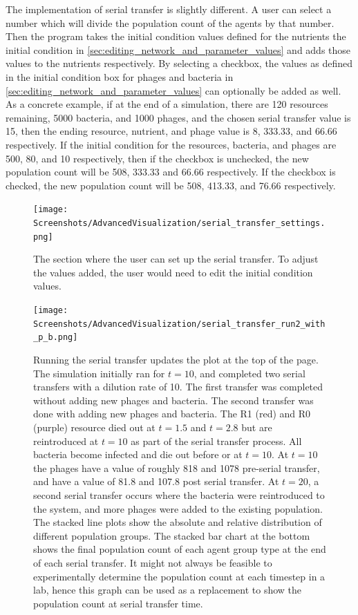 The implementation of serial transfer is slightly different. 
A user can select a number which will divide the population count of the agents by that number. 
Then the program takes the initial condition values defined for the nutrients the initial condition in \ref{sec:editing_network_and_parameter_values} and adds those values to the nutrients respectively. 
By selecting a checkbox, the values as defined in the initial condition box for phages and bacteria in \ref{sec:editing_network_and_parameter_values} can optionally be added as well. 
As a concrete example, if at the end of a simulation, there are 120 resources remaining, 5000 bacteria, and 1000 phages, and the chosen serial transfer value is 15, then the ending resource, nutrient, and phage value is 8, 333.33, and 66.66 respectively. 
If the initial condition for the resources, bacteria, and phages are 500, 80, and 10 respectively, then if the checkbox is unchecked, the new population count will be 508, 333.33 and 66.66 respectively. 
If the checkbox is checked, the new population count will be 508, 413.33, and 76.66 respectively. 

\begin{figure}
    \centering
    \texttt{[image: Screenshots/AdvancedVisualization/serial\_transfer\_settings.png]}
    \caption{
        The section where the user can set up the serial transfer. To adjust the values added, the user would need to edit the initial condition values. 
    }
    \label{fig:ss:av:serial_transfer_settings}
\end{figure}
\begin{figure}
    \centering
    \texttt{[image: Screenshots/AdvancedVisualization/serial\_transfer\_run2\_with\_p\_b.png]}
    \caption{
        Running the serial transfer updates the plot at the top of the page. 
        The simulation initially ran for $t=10$, and completed two serial transfers with a dilution rate of 10. 
        The first transfer was completed without adding new phages and bacteria. 
        The second transfer was done with adding new phages and bacteria. 
        The R1 (red) and R0 (purple) resource died out at $t=1.5$ and $t=2.8$ but are reintroduced at $t=10$ as part of the serial transfer process. 
        All bacteria become infected and die out before or at $t=10$. 
        At $t=10$ the phages have a value of roughly 818 and 1078 pre-serial transfer, and have a value of 81.8 and 107.8 post serial transfer. 
        At $t=20$, a second serial transfer occurs where the bacteria were reintroduced to the system, and more phages were added to the existing population. 
        The stacked line plots show the absolute and relative distribution of different population groups. 
        The stacked bar chart at the bottom shows the final population count of each agent group type at the end of each serial transfer. 
        It might not always be feasible to experimentally determine the population count at each timestep in a lab, hence this graph can be used as a replacement to show the population count at serial transfer time. 
    }
    \label{fig:ss:av:serial_transfer_run2_with_p_b}
\end{figure}

